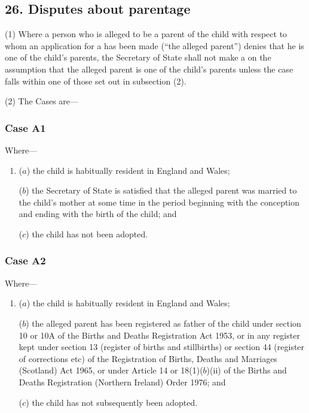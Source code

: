 \documentclass[12pt,a4paper]{article}
\begin{document}
\subsection{26. Disputes about parentage}

(1) Where a person who is alleged to be a parent of the child with respect to whom an application for a  has
been made (“the alleged parent”) denies that he is one of the child’s parents,
the Secretary of State shall not make a  on the assumption that the alleged parent is one of the
child’s parents unless the case falls within one of those set out in subsection (2).

(2) The Cases are---

\subsubsection*{Case A1}

Where---
\begin{enumerate}\item[]
($a$) the child is habitually resident in England and Wales;

($b$) the Secretary of State is satisfied that the alleged parent was married to
the child's mother at some time in the period beginning with the conception
and ending with the birth of the child; and

($c$) the child has not been adopted.
\end{enumerate}

\subsubsection*{Case A2}

Where---
\begin{enumerate}\item[]
($a$) the child is habitually resident in England and Wales;

($b$)
the alleged parent has been registered as father of the child under section 10 or 10A of the Births and Deaths Registration Act 1953, or in any register kept under section 13 (register of births and stillbirths) or section 44 (register of corrections etc) of the Registration of Births, Deaths and Marriages (Scotland) Act 1965, or under Article 14 or 18(1)($b$)(ii) of the Births and Deaths Registration (Northern Ireland) Order 1976; and

($c$)
the child has not subsequently been adopted.
\end{enumerate}
\end{document}
